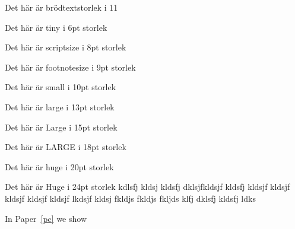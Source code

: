 \normalsize{Det här är brödtextstorlek i 11}

\tiny{Det här är tiny i 6pt storlek}

\scriptsize{Det här är scriptsize i 8pt storlek}

\footnotesize{Det här är footnotesize i 9pt storlek}

\small{Det här är small i 10pt storlek}

\large{Det här är large i 13pt storlek}

\Large{Det här är Large i 15pt storlek}

\LARGE{Det här är LARGE i 18pt storlek}

\huge{Det här är huge i 20pt storlek}

\Huge{Det här är Huge i 24pt storlek kdlsfj kldsj kldsfj dklsjfkldsjf kldsfj kldsjf kldsjf kldsjf kldsjf kldsjf lkdsjf kldsj fkldjs fkldjs fkljds klfj dklsfj kldsfj ldks}

\normalsize

In Paper~\ref{pc} we show
